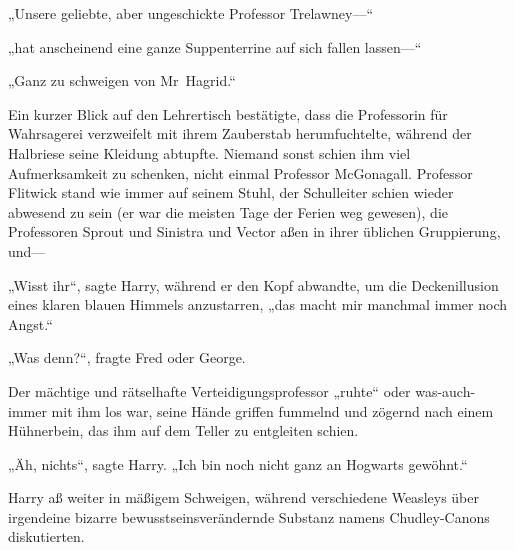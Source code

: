 „Unsere geliebte, aber ungeschickte Professor Trelawney—“

„hat anscheinend eine ganze Suppenterrine auf sich fallen lassen—“

„Ganz zu schweigen von Mr~Hagrid.“

Ein kurzer Blick auf den Lehrertisch bestätigte, dass die Professorin für Wahrsagerei verzweifelt mit ihrem Zauberstab herumfuchtelte, während der Halbriese seine Kleidung abtupfte. Niemand sonst schien ihm viel Aufmerksamkeit zu schenken, nicht einmal Professor McGonagall. Professor Flitwick stand wie immer auf seinem Stuhl, der Schulleiter schien wieder abwesend zu sein (er war die meisten Tage der Ferien weg gewesen), die Professoren Sprout und Sinistra und Vector aßen in ihrer üblichen Gruppierung, und—

„Wisst ihr“, sagte Harry, während er den Kopf abwandte, um die Deckenillusion eines klaren blauen Himmels anzustarren, „das macht mir manchmal immer noch Angst.“

„Was denn?“, fragte Fred oder George.

Der mächtige und rätselhafte Verteidigungsprofessor „ruhte“ oder was-auch-immer mit ihm los war, seine Hände griffen fummelnd und zögernd nach einem Hühnerbein, das ihm auf dem Teller zu entgleiten schien.

„Äh, nichts“, sagte Harry. „Ich bin noch nicht ganz an Hogwarts gewöhnt.“

Harry aß weiter in mäßigem Schweigen, während verschiedene Weasleys über irgendeine bizarre bewusstseinsverändernde Substanz namens Chudley-Canons diskutierten.

